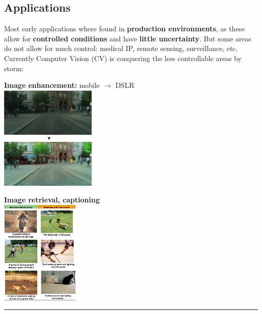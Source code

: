 \documentclass[a4paper, fontsize=8pt, landscape, DIV=1]{scrartcl}
\begin{document}
\begin{multicols*}{4}
		\subsection{Applications}
		Most early applications where found in \textbf{production environments}, as these allow for \textbf{controlled conditions} and have \textbf{little uncertainty}. But some areas do not allow for much control: medical IP, remote sensing, surveillance, etc.\\
		Currently Computer Vision (CV) is conquering the less controllable areas by storm:
		\par  
		\begin{minipage}[t]{0.49\columnwidth}
			\begin{flushleft}
		 		{\centering \textbf{Image enhancement:} mobile $\rightarrow$ DSLR\\}
		 		\includegraphics[width=\columnwidth, height=5cm]{images/Introduction/app_enhancement.png} 
			\end{flushleft}
		\end{minipage}
		\begin{minipage}[t]{0.49\columnwidth}
			\begin{flushright}
				{\centering \textbf{Image retrieval, captioning}\\}
				\includegraphics[width=\columnwidth, height=5cm]{images/Introduction/app_retrieval.png}
			\end{flushright}
		\end{minipage}
		\hrule
		\begin{minipage}[t]{0.49\columnwidth}

\end{minipage}
\end{multicols*}
\end{document}
